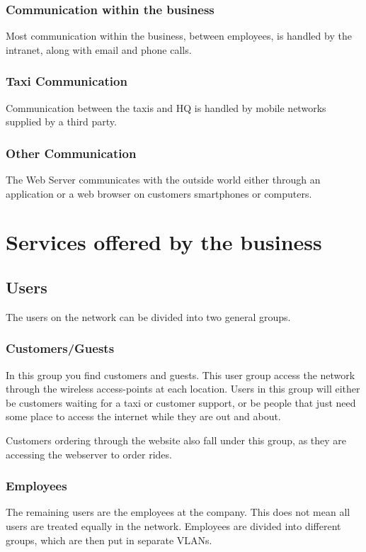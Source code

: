 \subsubsection{Communication within the business}
Most communication within the business, between employees, is handled by the intranet, along with email and phone calls.

\subsubsection{Taxi Communication}
Communication between the taxis and HQ is handled by mobile networks supplied by a third party.

\subsubsection{Other Communication} %
The Web Server communicates with the outside world either through an application or a web browser on customers smartphones or computers.

\section{Services offered by the business}

\subsection{Users}
The users on the network can be divided into two general groups.

\subsubsection{Customers/Guests}
In this group you find customers and guests. 
This user group access the network through the wireless access-points at each location.
Users in this group will either be customers waiting for a taxi or customer support, or be people that just need some place to access the internet while they are out and about.

Customers ordering through the website also fall under this group, as they are accessing the webserver to order rides.

\subsubsection{Employees}
The remaining users are the employees at the company.
This does not mean all users are treated equally in the network. 
Employees are divided into different groups, which are then put in separate VLANs.

